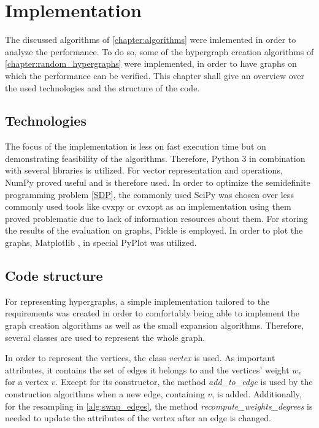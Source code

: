 \chapter{Implementation}\label{chapter:implementation}

The discussed algorithms of \cref{chapter:algorithms} were imlemented in order to analyze the performance. To do so, some of the hypergraph creation algorithms of \cref{chapter:random_hypergraphs} were implemented, in order to have graphs on which the performance can be verified. This chapter shall give an overview over the used technologies and the structure of the code.

\section{Technologies}
The focus of the implementation is less on fast execution time but on demonstrating feasibility of the algorithms. Therefore, Python 3 in combination with several libraries is utilized.
For vector representation and operations, NumPy \cite{numpy} proved useful and is therefore used. In order to optimize the semidefinite programming problem \cref{SDP}, the commonly used SciPy \cite{scipy} was chosen over less commonly used tools like cvxpy or cvxopt as an implementation using them proved problematic due to lack of information resources about them.
For storing the results of the evaluation on graphs, Pickle is employed. In order to plot the graphs, Matplotlib \cite{matplotlib}, in special PyPlot was utilized.



\section{Code structure}
For representing hypergraphs, a simple implementation tailored to the requirements was created in order to comfortably being able to implement the graph creation algorithms as well as the small expansion algorithms.
Therefore, several classes are used to represent the whole graph.

In order to represent the vertices, the class \textit{vertex} is used. As important attributes, it contains the set of edges it belongs to and the vertices' weight $w_v$ for a vertex $v$. Except for its constructor, the method \textit{add\_to\_edge} is used by the construction algorithms when a new edge, containing $v$, is added. Additionally, for the resampling in \cref{alg:swap_edges}, the method \textit{recompute\_weights\_degrees} is needed to update the attributes of the vertex after an edge is changed.

